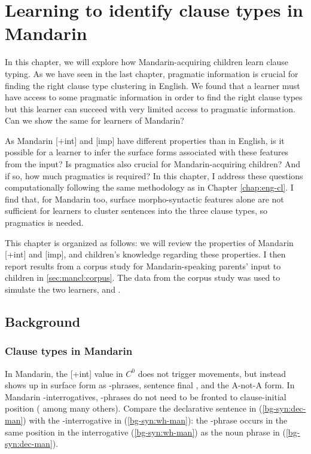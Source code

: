 \chapter{Learning to identify clause types in Mandarin}
\label{chap:man-cl}

In this chapter, we will explore how Mandarin-acquiring children learn clause typing. As we have seen in the last chapter, pragmatic information is crucial for finding the right clause type clustering in English. We found that a learner must have access to some pragmatic information in order to find the right clause types but this learner can succeed with very limited access to pragmatic information. Can we show the same for learners of Mandarin?

As Mandarin [+int] and [imp] have different properties than in English, is it possible for a learner to infer the surface forms associated with these features from the input? Is pragmatics also crucial for Mandarin-acquiring children? And if so, how much pragmatics is required? In this chapter, I address these questions computationally following the same methodology as in Chapter \ref{chap:eng-cl}. I find that, for Mandarin too, surface morpho-syntactic features alone are not sufficient for learners to cluster sentences into the three clause types, so pragmatics is needed. 

This chapter is organized as follows: we will review the properties of Mandarin [+int] and [imp], and children's knowledge regarding these properties. I then report results from a corpus study for Mandarin-speaking parents' input to children in  \ref{sec:mancl:corpus}. The data from the corpus study was used to simulate the two learners, \distlearner{} and \praglearner{}.  %

\section{Background}
\label{sec:mancl:bg}
\subsection{Clause types in Mandarin}
\label{sec:mancl:bg:theory}


In Mandarin, the [+int] value in $C^{0}$ does not trigger movements, but instead shows up in surface form as \twh-phrases, sentence final , and the A-not-A form. In Mandarin \twh-interrogatives, \twh-phrases  do not need to be fronted to clause-initial position (\citealt{huang1982, cheng1991} among many others). Compare the declarative sentence in (\ref{bg-syn:dec-man}) with the \twh-interrogative in (\ref{bg-syn:wh-man}): the \twh-phrase  occurs in the same position in the interrogative (\ref{bg-syn:wh-man}) as the noun phrase  in (\ref{bg-syn:dec-man}). 


